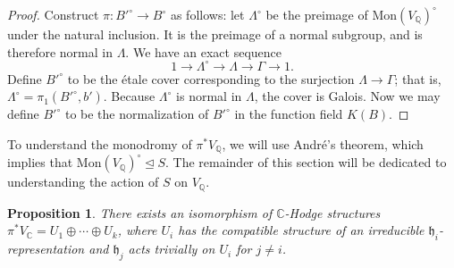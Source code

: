 \documentclass[12pt]{amsart}
\newcommand{\Q}{\mathbb{Q}}
\newcommand{\C}{\mathbb{C}}
\newtheorem{proposition}[theorem]{Proposition}
\theoremstyle{definition}
\numberwithin{equation}{section}
\begin{document}
\begin{proof}
Construct \(\pi: B'^\circ \to B^\circ\) as follows: let \(\Lambda^\circ\) be the preimage 
of \(\mathrm{Mon}(V_\Q)^\circ\) under the natural inclusion. It is the preimage of a normal 
subgroup, and is therefore normal in \(\Lambda\). We have an exact sequence 
\begin{equation*}
    1 \to \Lambda^\circ \to \Lambda \to \Gamma \to 1.
\end{equation*}
Define \(B'^\circ\) to be the \'etale cover corresponding to the surjection 
\(\Lambda \to \Gamma\); that is, \(\Lambda^\circ = \pi_1(B'^\circ, b')\). Because
\(\Lambda^\circ\) is normal in \(\Lambda\), the cover is Galois.
Now we may define \(B'^\circ\) to be the normalization of \(B'^\circ\) in the function 
field \(K(B)\).
\end{proof}

To understand the monodromy of \(\pi^* V_\Q\), we will use Andr\'e's theorem, which 
implies that \(\mathrm{Mon}(V_\Q)^\circ \trianglelefteq S\). The remainder of this 
section will be dedicated to understanding the action of \(S\) on \(V_\Q\).


\begin{proposition}
    There exists an isomorphism of \(\C\)-Hodge structures 
    \(\pi^* V_\C = U_1 \oplus \cdots \oplus U_k\), where \(U_i\) has the compatible 
    structure of an irreducible \(\mathfrak{h}_i\)-representation and 
    \(\mathfrak{h}_j\) acts trivially on \(U_i\) for \(j \neq i\).
\end{proposition}
\end{document}
